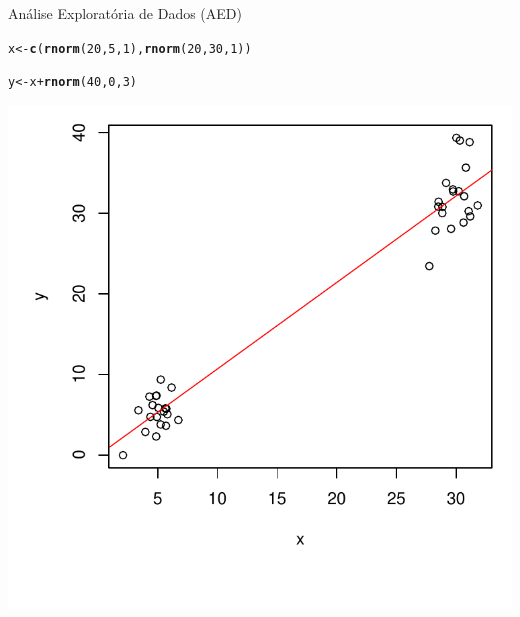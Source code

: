 \documentclass{beamer}\usepackage[]{graphicx}\usepackage[]{color}
\makeatletter
\newcommand{\hlnum}[1]{\textcolor[rgb]{0.686,0.059,0.569}{#1}}%
\newcommand{\hlopt}[1]{\textcolor[rgb]{0,0,0}{#1}}%
\newcommand{\hlstd}[1]{\textcolor[rgb]{0.345,0.345,0.345}{#1}}%
\newcommand{\hlkwb}[1]{\textcolor[rgb]{0.69,0.353,0.396}{#1}}%
\newcommand{\hlkwd}[1]{\textcolor[rgb]{0.737,0.353,0.396}{\textbf{#1}}}%
\newenvironment{kframe}{%
 \def\at@end@of@kframe{}%
 \ifinner\ifhmode%
  \def\at@end@of@kframe{\end{minipage}}%
  \begin{minipage}{\columnwidth}%
 \fi\fi%
 \def\FrameCommand##1{\hskip\@totalleftmargin \hskip-\fboxsep
 \colorbox{shadecolor}{##1}\hskip-\fboxsep
     \hskip-\linewidth \hskip-\@totalleftmargin \hskip\columnwidth}%
 \MakeFramed {\advance\hsize-\width
   \@totalleftmargin\z@ \linewidth\hsize
   \@setminipage}}%
 {\par\unskip\endMakeFramed%
 \at@end@of@kframe}
\newenvironment{knitrout}{}{} %
\renewenvironment{knitrout}{\setlength{\topsep}{0mm}}{}
\makeatother
\begin{document}
\begin{frame}{Análise Exploratória de Dados (AED)}

\begin{knitrout}\scriptsize
{}\color{fgcolor}\begin{kframe}
\begin{alltt}
\hlstd{x} \hlkwb{<-} \hlkwd{c}\hlstd{(}\hlkwd{rnorm}\hlstd{(}\hlnum{20}\hlstd{,}\hlnum{5}\hlstd{,}\hlnum{1}\hlstd{),}\hlkwd{rnorm}\hlstd{(}\hlnum{20}\hlstd{,}\hlnum{30}\hlstd{,}\hlnum{1}\hlstd{))}

\hlstd{y} \hlkwb{<-} \hlstd{x} \hlopt{+} \hlkwd{rnorm}\hlstd{(}\hlnum{40}\hlstd{,}\hlnum{0}\hlstd{,}\hlnum{3}\hlstd{)}
\end{alltt}
\end{kframe}
\end{knitrout}

\centering
\begin{knitrout}
\color{fgcolor}
\includegraphics[width=0.6\linewidth]{figure/bolasplot-1} 

\end{knitrout}



\end{frame} 
\end{document}
